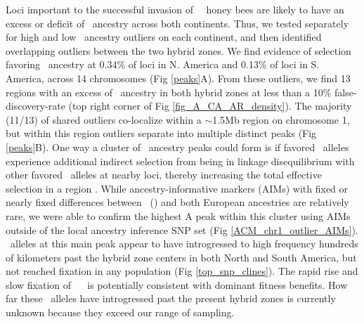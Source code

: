 Loci important to the successful invasion of \africanized\ \hyb\ honey bees are likely to have an excess or deficit of \scutellata\ ancestry across both continents. Thus, we tested separately for high and low \A\ ancestry outliers on each continent, and then identified overlapping outliers between the two hybrid zones. We find evidence of selection favoring \scutellata\ ancestry at 0.34\% of loci in N. America and 0.13\% of loci in S. America, across 14 chromosomes (Fig \ref{peaks}A). From these outliers, we find 13 regions with an excess of \A\ ancestry in both hybrid zones at less than a 10\% false-discovery-rate (top right corner of Fig \ref{fig_A_CA_AR_density}). The majority (11/13) of shared outliers co-localize within a $\sim$1.5Mb region on chromosome 1, but within this region outliers separate into multiple distinct peaks (Fig \ref{peaks}B). One way a cluster of \A\ ancestry peaks could form is if favored \scutellata\ alleles experience additional indirect selection from being in linkage disequilibrium with other favored \scutellata\ alleles at nearby loci, thereby increasing the total effective selection in a region \cite{Barton:1983fx}. While ancestry-informative markers (AIMs) with fixed or nearly fixed differences between \scutellata\ \ahb(\A) and both European  ancestries are relatively rare, we were able to confirm the highest A peak within this cluster using AIMs outside of the local ancestry inference SNP set (Fig \ref{ACM_chr1_outlier_AIMs}). \A\ alleles at this main peak appear to have introgressed to high frequency hundreds of kilometers past the hybrid zone centers in both North and South America, but not reached fixation in any population (Fig \ref{top_snp_clines}). The rapid rise and slow fixation of \A\ \anc\  is potentially consistent with dominant fitness benefits. How far these \A\ alleles have introgressed past the present hybrid zones is currently unknown because they exceed our range of sampling.  

